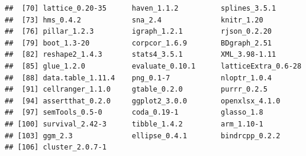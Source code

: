 \documentclass[]{article}
\begin{document}
\begin{verbatim}
##  [70] lattice_0.20-35      haven_1.1.2          splines_3.5.1       
##  [73] hms_0.4.2            sna_2.4              knitr_1.20          
##  [76] pillar_1.2.3         igraph_1.2.1         rjson_0.2.20        
##  [79] boot_1.3-20          corpcor_1.6.9        BDgraph_2.51        
##  [82] reshape2_1.4.3       stats4_3.5.1         XML_3.98-1.11       
##  [85] glue_1.2.0           evaluate_0.10.1      latticeExtra_0.6-28 
##  [88] data.table_1.11.4    png_0.1-7            nloptr_1.0.4        
##  [91] cellranger_1.1.0     gtable_0.2.0         purrr_0.2.5         
##  [94] assertthat_0.2.0     ggplot2_3.0.0        openxlsx_4.1.0      
##  [97] semTools_0.5-0       coda_0.19-1          glasso_1.8          
## [100] survival_2.42-3      tibble_1.4.2         arm_1.10-1          
## [103] ggm_2.3              ellipse_0.4.1        bindrcpp_0.2.2      
## [106] cluster_2.0.7-1
\end{verbatim}
\end{document}
